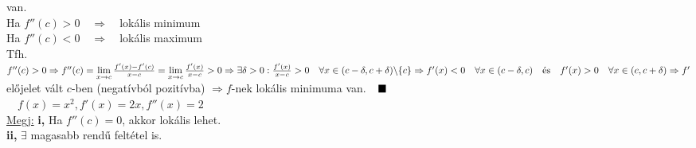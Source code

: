\documentclass[a4paper,11pt]{article}
\begin{document}
van.\\[0.2cm]Ha $f''(c)>0\quad\Rightarrow\quad$lokális minimum\\[0.2cm]Ha 
$f''(c)<0\quad\Rightarrow\quad$lokális maximum\\[0.2cm]\biz Tfh. $f''(c)>0 
\Rightarrow f''(c)=\lim\limits_{x\to c}\frac{f'(x)-f'(c)}{x-c}=
\lim\limits_{x\to c} \frac{f'(x)}{x-c}>0\\[0.2cm]\Rightarrow\exists\delta>0:
\frac{f'(x)}{x-c}>0\quad \forall x\in(c-\delta,c+\delta)\backslash\{c\}\\[0.2cm]
\Rightarrow f'(x)<0\quad \forall x\in(c-\delta,c)\quad\text{és}\quad 
f'(x)>0\quad \forall x\in(c,c+\delta) \\[0.2cm]\Rightarrow f'$ előjelet vált 
$c$-ben (negatívból pozitívba) $\Rightarrow f$-nek lokális minimuma 
van.$\quad\blacksquare$\\[0.3cm]\pl$\quad f(x)=x^2,f'(x)=2x,f''(x)=2$ \\[0.2cm]
\hspace*{0.4cm}\underline{Megj:} \textbf{i,} Ha $f''(c)=0$, akkor lokális 
lehet.\\[0.2cm]\hspace*{1.4cm}\textbf{ii,} $\exists$ magasabb rendű feltétel is.
\end{document}
